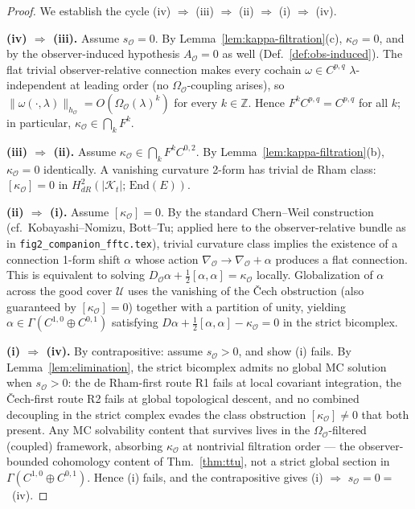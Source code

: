 \documentclass[11pt]{article}
\newcommand{\Obs}{\mathcal{O}}
\newcommand{\OmegaO}{\Omega_{\Obs}}
\newcommand{\kappaO}{\kappa_{\Obs}}
\newcommand{\AO}{A_{\Obs}}
\newcommand{\nablaO}{\nabla_{\Obs}}
\newcommand{\hO}{h_{\Obs}}
\newcommand{\DO}{D_{\Obs}}
\newcommand{\rmin}{s_{\Obs}}
\newcommand{\EE}{E}
\newcommand{\Kt}{\mathcal{K}_t}
\newcommand{\End}{\mathrm{End}}
\begin{document}
\begin{proof}
We establish the cycle
(iv) $\Rightarrow$ (iii) $\Rightarrow$ (ii) $\Rightarrow$ (i)
$\Rightarrow$ (iv).

\textbf{(iv) $\Rightarrow$ (iii).}
Assume $\rmin = 0$. By Lemma~\ref{lem:kappa-filtration}(c),
$\kappaO = 0$, and by the observer-induced hypothesis $\AO = 0$
as well (Def.~\ref{def:obs-induced}). The flat trivial
observer-relative connection makes every cochain
$\omega \in C^{p,q}$ $\lambda$-independent at leading order
(no $\OmegaO$-coupling arises), so
$\|\omega(\cdot, \lambda)\|_{\hO} = O(\OmegaO(\lambda)^k)$ for
every $k \in \mathbb{Z}$. Hence $F^k C^{p, q} = C^{p, q}$ for
all $k$; in particular, $\kappaO \in \bigcap_k F^k$.

\textbf{(iii) $\Rightarrow$ (ii).}
Assume $\kappaO \in \bigcap_k F^k C^{0, 2}$. By
Lemma~\ref{lem:kappa-filtration}(b), $\kappaO = 0$ identically.
A vanishing curvature 2-form has trivial de Rham class:
$[\kappaO] = 0$ in $H^2_{dR}(|\Kt|;\, \End(\EE))$.

\textbf{(ii) $\Rightarrow$ (i).}
Assume $[\kappaO] = 0$. By the standard Chern--Weil construction
(cf.\ Kobayashi--Nomizu, Bott--Tu; applied here to the
observer-relative bundle as in \texttt{fig2\_companion\_fftc.tex}),
trivial curvature class implies the existence of a connection
1-form shift $\alpha$ whose action $\nablaO \to \nablaO + \alpha$
produces a flat connection. This is equivalent to solving
$\DO \alpha + \tfrac{1}{2}[\alpha, \alpha] = \kappaO$ locally.
Globalization of $\alpha$ across the good cover $\mathcal{U}$
uses the vanishing of the \v{C}ech obstruction (also guaranteed by
$[\kappaO] = 0$) together with a partition of unity, yielding
$\alpha \in \Gamma(C^{1,0} \oplus C^{0,1})$ satisfying
$D\alpha + \tfrac{1}{2}[\alpha, \alpha] - \kappaO = 0$ in the
strict bicomplex.

\textbf{(i) $\Rightarrow$ (iv).}
By contrapositive: assume $\rmin > 0$, and show (i) fails. By
Lemma~\ref{lem:elimination}, the strict bicomplex admits no
global MC solution when $\rmin > 0$: the de Rham-first route R1
fails at local covariant integration, the \v{C}ech-first route
R2 fails at global topological descent, and no combined decoupling
in the strict complex evades the class obstruction
$[\kappaO] \neq 0$ that both present. Any MC solvability content
that survives lives in the $\OmegaO$-filtered (coupled)
framework, absorbing $\kappaO$ at nontrivial filtration order ---
the observer-bounded cohomology content of Thm.~\ref{thm:ttu},
not a strict global section in
$\Gamma(C^{1,0} \oplus C^{0,1})$. Hence (i) fails, and the
contrapositive gives (i) $\Rightarrow$ $\rmin = 0 =$~(iv).
\end{proof}
\end{document}
